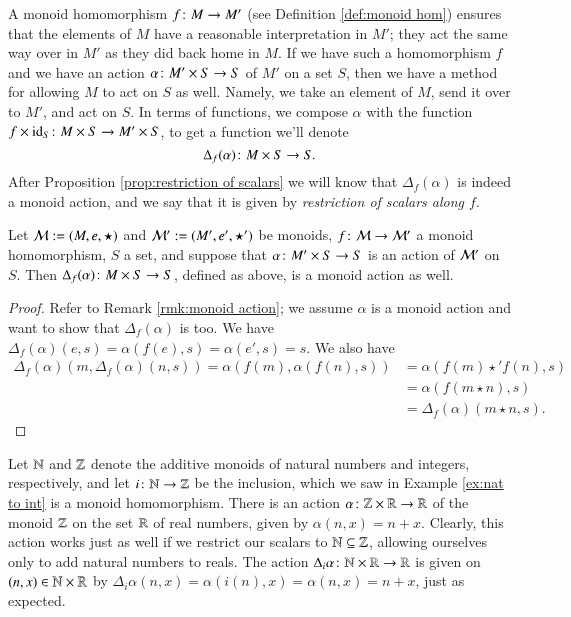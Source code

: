 A monoid homomorphism $f\colon M\rightarrow M'$ (see Definition \ref{def:monoid hom}) ensures that the elements of $M$ have a reasonable interpretation in $M'$; they act the same way over in $M'$ as they did back home in $M$. If we have such a homomorphism $f$ and we have an action $\alpha\colon M'\times S\rightarrow S$ of $M'$ on a set $S$, then we have a method for allowing $M$ to act on $S$ as well. Namely, we take an element of $M$, send it over to $M'$, and act on $S$. In terms of functions, we compose $\alpha$ with the function $f\times\id_S\taking M\times S\to M'\times S$, to get a function we'll denote $$\Delta_f(\alpha)\colon M\times S\rightarrow S.$$ After Proposition \ref{prop:restriction of scalars} we will know that $\Delta_f(\alpha)$ is indeed a monoid action, and we say that it is given by {\em restriction of scalars along $f$}.

\begin{proposition}\label{prop:restriction of scalars}

Let $\mathcal{M}:=(M,e,\star)$ and $\mathcal{M}':=(M',e',\star')$ be monoids, $f\colon\mathcal{M}\rightarrow\mathcal{M}'$ a monoid homomorphism, $S$ a set, and suppose that $\alpha\colon M'\times S\rightarrow S$ is an action of $\mathcal{M}'$ on $S$. Then $\Delta_f(\alpha)\colon M\times S\rightarrow S$, defined as above, is a monoid action as well.

\end{proposition}

\begin{proof}

Refer to Remark \ref{rmk:monoid action}; we assume $\alpha$ is a monoid action and want to show that $\Delta_f(\alpha)$ is too. We have $\Delta_f(\alpha)(e,s)=\alpha(f(e),s)=\alpha(e',s)=s$. We also have 
\begin{align*}
\Delta_f(\alpha)(m,\Delta_f(\alpha)(n,s))=\alpha(f(m),\alpha(f(n),s))&=\alpha(f(m)\star' f(n),s)\\
&=\alpha(f(m\star n),s)\\
&=\Delta_f(\alpha)(m\star n,s).
\end{align*}

\end{proof}

\begin{example}

Let ${\mathbb N}$ and ${\mathbb Z}$ denote the additive monoids of natural numbers and integers, respectively, and let $i\colon{\mathbb N}\rightarrow{\mathbb Z}$ be the inclusion, which we saw in Example \ref{ex:nat to int} is a monoid homomorphism. There is an action $\alpha\colon{\mathbb Z}\times{\mathbb R}\rightarrow{\mathbb R}$ of the monoid ${\mathbb Z}$ on the set ${\mathbb R}$ of real numbers, given by $\alpha(n,x)=n+x$. Clearly, this action works just as well if we restrict our scalars to ${\mathbb N}\subseteq{\mathbb Z}$, allowing ourselves only to add natural numbers to reals. The action $\Delta_i\alpha\colon{\mathbb N}\times{\mathbb R}\rightarrow{\mathbb R}$ is given on $(n,x)\in{\mathbb N}\times{\mathbb R}$ by $\Delta_i\alpha(n,x)=\alpha(i(n),x)=\alpha(n,x)=n+x$, just as expected.

\end{example}

